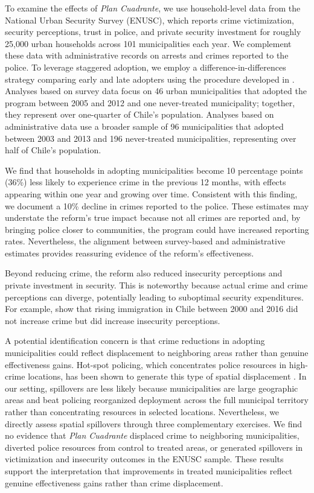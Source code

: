 To examine the effects of \emph{Plan Cuadrante}, we use household-level data from the National Urban Security Survey (ENUSC), which reports crime victimization, security perceptions, trust in police, and private security investment for roughly 25,000 urban households across 101 municipalities each year. We complement these data with administrative records on arrests and crimes reported to the police. To leverage staggered adoption, we employ a difference-in-differences strategy comparing early and late adopters using the procedure developed in \citet{Callaway}. Analyses based on survey data focus on 46 urban municipalities that adopted the program between 2005 and 2012 and one never-treated municipality; together, they represent over one-quarter of Chile's population. Analyses based on administrative data use a broader sample of 96 municipalities that adopted between 2003 and 2013 and 196 never-treated municipalities, representing over half of Chile's population.

We find that households in adopting municipalities become 10 percentage points (36\%) less likely to experience crime in the previous 12 months, with effects appearing within one year and growing over time. Consistent with this finding, we document a 10\% decline in crimes reported to the police. These estimates may understate the reform's true impact because not all crimes are reported and, by bringing police closer to communities, the program could have increased reporting rates. Nevertheless, the alignment between survey-based and administrative estimates provides reassuring evidence of the reform's effectiveness.

Beyond reducing crime, the reform also reduced insecurity perceptions and private investment in security. This is noteworthy because actual crime and crime perceptions can diverge, potentially leading to suboptimal security expenditures. For example, \citet{Ajzenman_Pato} show that rising immigration in Chile between 2000 and 2016 did not increase crime but did increase insecurity perceptions.

A potential identification concern is that crime reductions in adopting municipalities could reflect displacement to neighboring areas rather than genuine effectiveness gains. Hot-spot policing, which concentrates police resources in high-crime locations, has been shown to generate this type of spatial displacement \citep{Blattman_Tobon_JEEA}. In our setting, spillovers are less likely because municipalities are large geographic areas and beat policing reorganized deployment across the full municipal territory rather than concentrating resources in selected locations. Nevertheless, we directly assess spatial spillovers through three complementary exercises. We find no evidence that \emph{Plan Cuadrante} displaced crime to neighboring municipalities, diverted police resources from control to treated areas, or generated spillovers in victimization and insecurity outcomes in the ENUSC sample. These results support the interpretation that improvements in treated municipalities reflect genuine effectiveness gains rather than crime displacement.

